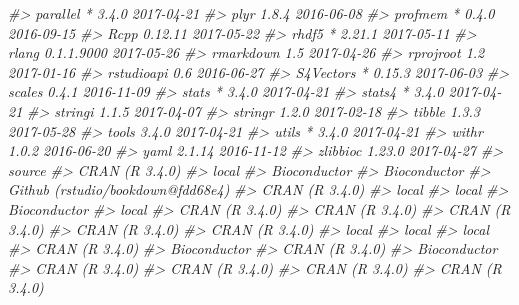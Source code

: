 \documentclass[]{book}
\newenvironment{Shaded}{\begin{snugshade}}{\end{snugshade}}
\newcommand{\CommentTok}[1]{\textcolor[rgb]{0.56,0.35,0.01}{\textit{#1}}}
\begin{document}
\begin{Shaded}
\begin{Highlighting}[]
\CommentTok{#>  parallel           * 3.4.0      2017-04-21}
\CommentTok{#>  plyr                 1.8.4      2016-06-08}
\CommentTok{#>  profmem            * 0.4.0      2016-09-15}
\CommentTok{#>  Rcpp                 0.12.11    2017-05-22}
\CommentTok{#>  rhdf5              * 2.21.1     2017-05-11}
\CommentTok{#>  rlang                0.1.1.9000 2017-05-26}
\CommentTok{#>  rmarkdown            1.5        2017-04-26}
\CommentTok{#>  rprojroot            1.2        2017-01-16}
\CommentTok{#>  rstudioapi           0.6        2016-06-27}
\CommentTok{#>  S4Vectors          * 0.15.3     2017-06-03}
\CommentTok{#>  scales               0.4.1      2016-11-09}
\CommentTok{#>  stats              * 3.4.0      2017-04-21}
\CommentTok{#>  stats4             * 3.4.0      2017-04-21}
\CommentTok{#>  stringi              1.1.5      2017-04-07}
\CommentTok{#>  stringr              1.2.0      2017-02-18}
\CommentTok{#>  tibble               1.3.3      2017-05-28}
\CommentTok{#>  tools                3.4.0      2017-04-21}
\CommentTok{#>  utils              * 3.4.0      2017-04-21}
\CommentTok{#>  withr                1.0.2      2016-06-20}
\CommentTok{#>  yaml                 2.1.14     2016-11-12}
\CommentTok{#>  zlibbioc             1.23.0     2017-04-27}
\CommentTok{#>  source                           }
\CommentTok{#>  CRAN (R 3.4.0)                   }
\CommentTok{#>  local                            }
\CommentTok{#>  Bioconductor                     }
\CommentTok{#>  Bioconductor                     }
\CommentTok{#>  Github (rstudio/bookdown@fdd68e4)}
\CommentTok{#>  CRAN (R 3.4.0)                   }
\CommentTok{#>  local                            }
\CommentTok{#>  local                            }
\CommentTok{#>  Bioconductor                     }
\CommentTok{#>  local                            }
\CommentTok{#>  CRAN (R 3.4.0)                   }
\CommentTok{#>  CRAN (R 3.4.0)                   }
\CommentTok{#>  CRAN (R 3.4.0)                   }
\CommentTok{#>  CRAN (R 3.4.0)                   }
\CommentTok{#>  CRAN (R 3.4.0)                   }
\CommentTok{#>  local                            }
\CommentTok{#>  local                            }
\CommentTok{#>  local                            }
\CommentTok{#>  CRAN (R 3.4.0)                   }
\CommentTok{#>  Bioconductor                     }
\CommentTok{#>  CRAN (R 3.4.0)                   }
\CommentTok{#>  Bioconductor                     }
\CommentTok{#>  CRAN (R 3.4.0)                   }
\CommentTok{#>  CRAN (R 3.4.0)                   }
\CommentTok{#>  CRAN (R 3.4.0)                   }
\CommentTok{#>  CRAN (R 3.4.0)                   }

\end{Highlighting}
\end{Shaded}
\end{document}
